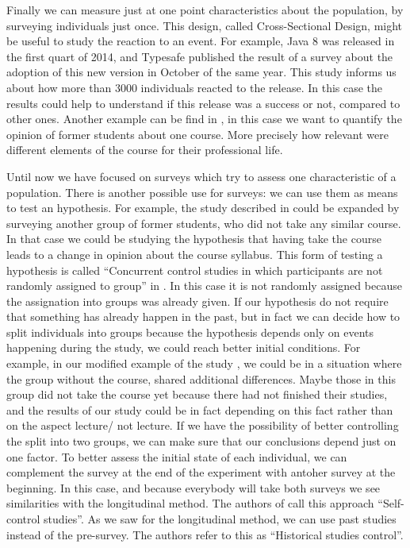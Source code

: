 \documentclass{report}
\begin{document}
Finally we can measure just at one point characteristics about the population, by surveying individuals just once. This design, called Cross-Sectional Design, might be useful to study the reaction to an event. For example, Java 8 was released in the first quart of 2014, and Typesafe published the result of a survey about the adoption of this new version in October of the same year. This study informs us about how more than 3000 individuals reacted to the release. In this case the results could help to understand if this release was a success or not, compared to other ones. Another example can be find in \cite{DBLP:dblp_conf/er/TortOP13}, in this case we want to quantify the opinion of former students about one course. More precisely how relevant were different elements of the course for their professional life.

Until now we have focused on surveys which try to assess one characteristic of a population. There is another possible use for surveys: we can use them as means to test an hypothesis.
For example, the study described in \cite{DBLP:dblp_conf/er/TortOP13} could be expanded by surveying another group of former students, who did not take any similar course. In that case we could be studying the hypothesis that having take the course leads to a change in opinion about the course syllabus. This form of testing a hypothesis is  called “Concurrent control studies in which participants are not randomly assigned to group” in \cite{Kitchenham2002}. In this case it is not randomly assigned because the assignation into groups was already given.
If our hypothesis do not require that something has already happen in the past, but in fact we can decide how to split individuals into groups because the hypothesis depends only on events happening during the study, we could reach better initial conditions. For example, in our modified example of the study \cite{DBLP:dblp_conf/er/TortOP13}, we could be in a situation where the group without the course, shared additional differences. Maybe those in this group did not take the course yet because there had not finished their studies, and the results of our study could be in fact depending on this fact rather than on the aspect lecture/ not lecture. If we have the possibility of better controlling the split into two groups, we can make sure that our conclusions depend just on one factor.
To better assess the initial state of each individual, we can complement the survey at the end of the experiment with antoher survey at the beginning. In this case, and because everybody will take both surveys we see similarities with the longitudinal method. The authors of \cite{Kitchenham2002} call this approach “Self-control studies”. As we saw for the longitudinal method, we can use past studies instead of the pre-survey. The authors refer to this as “Historical studies control”.
\end{document}
